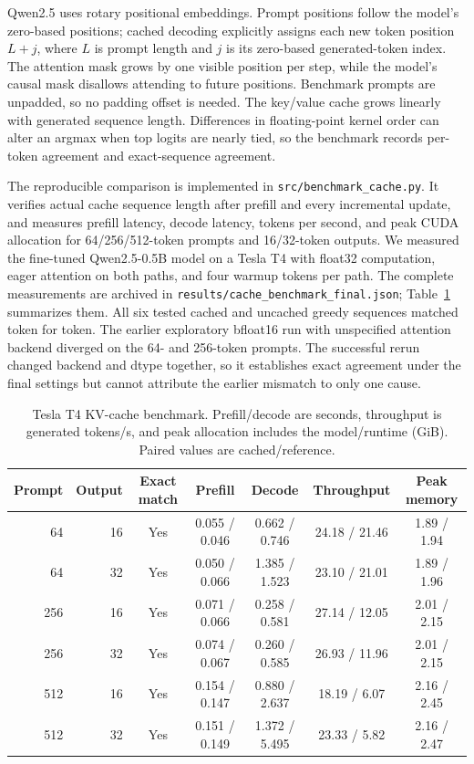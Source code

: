 \documentclass[conference]{IEEEtran}
\begin{document}
Qwen2.5 uses rotary positional embeddings. Prompt positions follow the model's zero-based positions; cached decoding explicitly assigns each new token position $L+j$, where $L$ is prompt length and $j$ is its zero-based generated-token index. The attention mask grows by one visible position per step, while the model's causal mask disallows attending to future positions. Benchmark prompts are unpadded, so no padding offset is needed. The key/value cache grows linearly with generated sequence length. Differences in floating-point kernel order can alter an argmax when top logits are nearly tied, so the benchmark records per-token agreement and exact-sequence agreement.

The reproducible comparison is implemented in \texttt{src/benchmark\_cache.py}. It verifies actual cache sequence length after prefill and every incremental update, and measures prefill latency, decode latency, tokens per second, and peak CUDA allocation for 64/256/512-token prompts and 16/32-token outputs. We measured the fine-tuned Qwen2.5-0.5B model on a Tesla T4 with float32 computation, eager attention on both paths, and four warmup tokens per path. The complete measurements are archived in \texttt{results/cache\_benchmark\_final.json}; Table~\ref{tab:cache-final} summarizes them. All six tested cached and uncached greedy sequences matched token for token. The earlier exploratory bfloat16 run with unspecified attention backend diverged on the 64- and 256-token prompts. The successful rerun changed backend and dtype together, so it establishes exact agreement under the final settings but cannot attribute the earlier mismatch to only one cause.

\begin{table}[t]
\centering
\caption{Tesla T4 KV-cache benchmark. Prefill/decode are seconds, throughput is generated tokens/s, and peak allocation includes the model/runtime (GiB). Paired values are cached/reference.}
\label{tab:cache-final}
\small
\begin{tabular}{rrccccc}
\hline
Prompt & Output & Exact match & Prefill & Decode & Throughput & Peak memory \\
\hline
64 & 16 & Yes & 0.055 / 0.046 & 0.662 / 0.746 & 24.18 / 21.46 & 1.89 / 1.94 \\
64 & 32 & Yes & 0.050 / 0.066 & 1.385 / 1.523 & 23.10 / 21.01 & 1.89 / 1.96 \\
256 & 16 & Yes & 0.071 / 0.066 & 0.258 / 0.581 & 27.14 / 12.05 & 2.01 / 2.15 \\
256 & 32 & Yes & 0.074 / 0.067 & 0.260 / 0.585 & 26.93 / 11.96 & 2.01 / 2.15 \\
512 & 16 & Yes & 0.154 / 0.147 & 0.880 / 2.637 & 18.19 / 6.07 & 2.16 / 2.45 \\
512 & 32 & Yes & 0.151 / 0.149 & 1.372 / 5.495 & 23.33 / 5.82 & 2.16 / 2.47 \\
\hline
\end{tabular}
\end{table}
\end{document}

